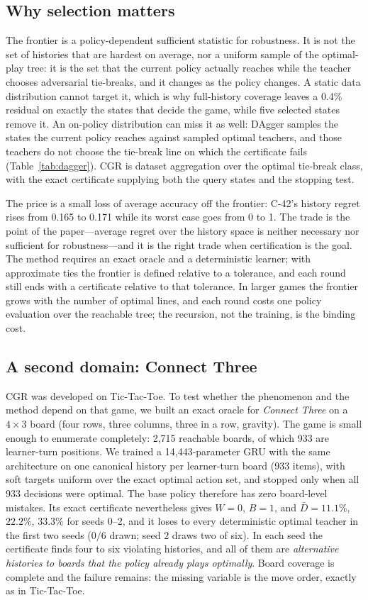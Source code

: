 \documentclass[conference]{IEEEtran}
\begin{document}
\subsection{Why selection matters}
The frontier is a policy-dependent sufficient statistic for robustness. It is not the set of histories that are hardest on average, nor a uniform sample of the optimal-play tree: it is the set that the current policy actually reaches while the teacher chooses adversarial tie-breaks, and it changes as the policy changes. A static data distribution cannot target it, which is why full-history coverage leaves a 0.4\% residual on exactly the states that decide the game, while five selected states remove it. An on-policy distribution can miss it as well: DAgger samples the states the current policy reaches against sampled optimal teachers, and those teachers do not choose the tie-break line on which the certificate fails (Table~\ref{tab:dagger}). CGR is dataset aggregation \cite{ross2011} over the optimal tie-break class, with the exact certificate supplying both the query states and the stopping test.

The price is a small loss of average accuracy off the frontier: C-42's history regret rises from 0.165 to 0.171 while its worst case goes from 0 to 1. The trade is the point of the paper---average regret over the history space is neither necessary nor sufficient for robustness---and it is the right trade when certification is the goal. The method requires an exact oracle and a deterministic learner; with approximate ties the frontier is defined relative to a tolerance, and each round still ends with a certificate relative to that tolerance. In larger games the frontier grows with the number of optimal lines, and each round costs one policy evaluation over the reachable tree; the recursion, not the training, is the binding cost.

\subsection{A second domain: Connect Three}
CGR was developed on Tic-Tac-Toe. To test whether the phenomenon and the method depend on that game, we built an exact oracle for \emph{Connect Three} on a $4\times3$ board (four rows, three columns, three in a row, gravity). The game is small enough to enumerate completely: 2{,}715 reachable boards, of which 933 are learner-turn positions. We trained a 14{,}443-parameter GRU with the same architecture on one canonical history per learner-turn board (933 items), with soft targets uniform over the exact optimal action set, and stopped only when all 933 decisions were optimal. The base policy therefore has zero board-level mistakes. Its exact certificate nevertheless gives $W=0$, $B=1$, and $\bar D=11.1\%$, $22.2\%$, $33.3\%$ for seeds 0--2, and it loses to every deterministic optimal teacher in the first two seeds ($0/6$ drawn; seed 2 draws two of six). In each seed the certificate finds four to six violating histories, and all of them are \emph{alternative histories to boards that the policy already plays optimally}. Board coverage is complete and the failure remains: the missing variable is the move order, exactly as in Tic-Tac-Toe.
\end{document}
